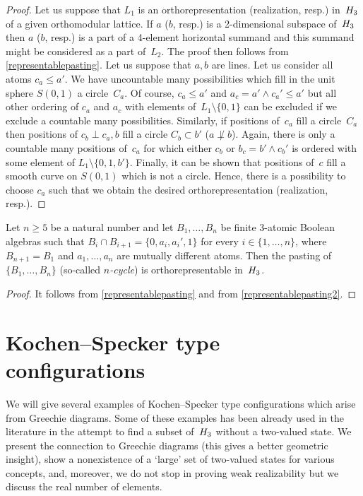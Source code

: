 \begin {proof}
Let us suppose that $L_1$ is an orthorepresentation (realization, resp.)
in~$H_3$ of a given orthomodular lattice. If $a$ ($b$, resp.) is a
2-dimensional subspace of~$H_3$ then $a$ ($b$, resp.) is a part of a
4-element horizontal summand and this summand might be considered as a part
of~$L_2$. The proof then follows from \ref{representablepasting}. Let
us suppose that $a,b$ are lines. Let us consider all atoms $c_a \le a'$. We
have uncountable many possibilities which fill in the unit sphere $S(0,1)$ a
circle~$C_a$. Of course, $c_a \le a'$ and $a_c = a' \land c_a' \le a'$ but
all other ordering of $c_a$ and $a_c$ with elements of~$L_1 \setminus
\{0,1\}$ can be excluded if we exclude a countable many possibilities.
Similarly, if positions of~$c_a$ fill a circle~$C_a$ then positions of $c_b
\perp c_a,b$ fill a circle $C_b \subset b'$ ($a \not\perp b$). Again, there
is only a countable many positions of~$c_a$ for which either $c_b$ or $b_c =
b' \land c_b'$ is ordered with some element of $L_1 \setminus \{0,1,b'\}$.
Finally, it can be shown that positions of~$c$ fill a smooth curve on
$S(0,1)$ which is not a circle. Hence, there is a possibility to choose
$c_a$ such that we obtain the desired orthorepresentation (realization,
resp.).
\end {proof}


\begin {proposition}
Let $n \ge 5$ be a natural number and let $B_1,\ldots,B_n$ be finite
3-atomic Boolean algebras such that $B_i \cap B_{i+1} = \{0,a_i,a_i',1\}$
for every $i\in \{1,\ldots,n\}$, where $B_{n+1} = B_1$ and $a_1,\ldots,a_n$
are mutually different atoms. Then the pasting of $\{B_1,\ldots,B_n\}$
(so-called {\em $n$-cycle\/}) is orthorepresentable in~$H_3$.
\end {proposition}


\begin {proof}
It follows from \ref{representablepasting} and from
\ref{representablepasting2}.
\end {proof}




\section {Kochen--Specker type configurations}


We will give several examples of Kochen--Specker type configurations which
arise from Greechie diagrams. Some of these examples has been already used
in the literature in the attempt to find a subset of~$H_3$ without a
two-valued state. We present the connection to Greechie diagrams (this gives
a better geometric insight), show a nonexistence of a `large' set of
two-valued states for various concepts, and, moreover, we do not stop in
proving weak realizability but we discuss the real number of elements.


